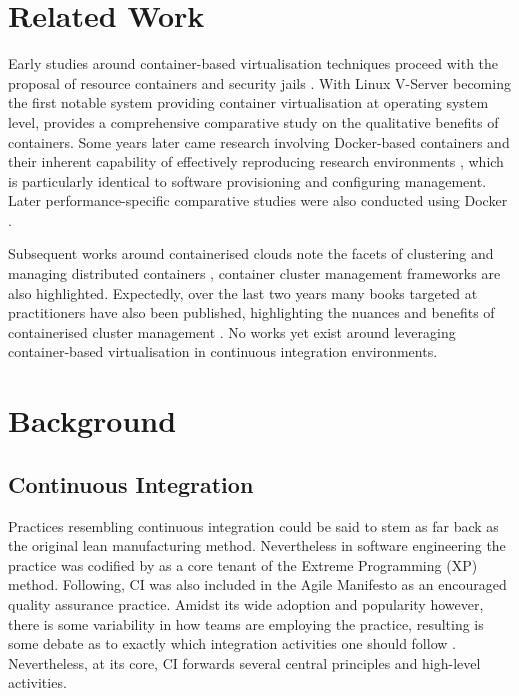 \documentclass{report}
\begin{document}
\section{Related Work}
Early studies around container-based virtualisation techniques
proceed with the proposal of resource containers \citep{Banga} and security
jails \citep{Kamp}.  With Linux V-Server becoming the first notable system providing
container virtualisation at operating system level, \citet{Soltesz} provides a comprehensive comparative 
study on the qualitative benefits of containers. Some years later
came research involving Docker-based containers and their inherent capability of effectively
reproducing research environments \citep{Boettiger}, which is particularly identical to software provisioning 
and configuring management. Later performance-specific comparative studies were also conducted 
using Docker \citep{Agarwal}.
\par
Subsequent works around containerised clouds note 
the facets of clustering and managing distributed containers \citep{Claus, Verma}, container 
cluster management frameworks are also highlighted. 
Expectedly, over the last two years many books targeted at practitioners have also been  
published, highlighting the nuances and benefits of containerised cluster management
\citep{db, holla, Rensin, Brewer}. No works yet exist around
leveraging container-based virtualisation in continuous integration environments.  

\section{Background}
\subsection{Continuous Integration}
Practices resembling continuous integration could be said
to stem as far back as the original lean manufacturing method. 
Nevertheless in software
engineering the practice was codified by \citet{Beck} 
as a core tenant of the Extreme Programming (XP) method.
Following, CI was also included in the Agile Manifesto as an encouraged
quality assurance practice. Amidst its wide adoption and popularity however, 
there is some variability in how teams are employing the practice, resulting 
is some debate as to exactly which integration activities one should follow \citep{Stahl}.
Nevertheless, at its core, CI forwards several central principles and high-level activities.
\end{document}
